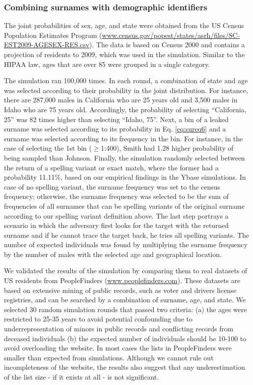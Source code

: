 \subsubsection{Combining surnames with demographic identifiers}
The joint probabilities of sex, age, and state were obtained from the US Census Population Estimates Program (\url{www.census.gov/popest/states/asrh/files/SC-EST2009-AGESEX-RES.csv}). The data is based on Census 2000 and contains a projection of residents to 2009, which was used in the simulation. Similar to the HIPAA law, ages that are over 85 were grouped in a single category. 

The simulation ran 100,000 times. In each round, a combination of state and age was selected according to their probability in the joint distribution. For instance, there are 287,000 males in California who are 25 years old and 3,500 males in Idaho who are 75 years old. Accordingly, the probability of selecting ``California, 25'' was 82 times higher than selecting ``Idaho, 75''. Next, a bin of a leaked surname was selected according to its probability in Eq. \ref{eq:sureq6} and a surname was selected according to its frequency in the bin. For instance, in the case of selecting the 1st bin ($\geq$1:400), Smith had 1.28 higher probability of being sampled than Johnson. Finally, the simulation randomly selected between the return of a spelling variant or exact match, where the former had a probability 11.11\%, based on our empirical findings in the Ybase simulations. In case of no spelling variant, the surname frequency was set to the census frequency; otherwise, the surname frequency was selected to be the sum of frequencies of all surnames that can be spelling variants of the original surname according to our spelling variant definition above. The last step portrays a scenario in which the adversary first looks for the target with the returned surname and if he cannot trace the target back, he tries all spelling variants. The number of expected individuals was found by multiplying the surname frequency by the number of males with the selected age and geographical location.

We validated the results of the simulation by comparing them to real datasets of US residents from PeopleFinders (\url{www.peoplefinders.com}). These datasets are based on extensive mining of public records, such as voter and drivers license registries, and can be searched by a combination of surname, age, and state. We selected 30 random simulation rounds that passed two criteria: (a) the ages were restricted to 25-35 years to avoid potential confounding due to underrepresentation of minors in public records and conflicting records from deceased individuals (b) the expected number of individuals should be 10-100 to avoid overloading the website. In most cases the lists in PeopleFinders were smaller than expected from simulations. Although we cannot rule out incompleteness of the website, the results also suggest that any underestimation of the list size - if it exists at all - is not significant.


